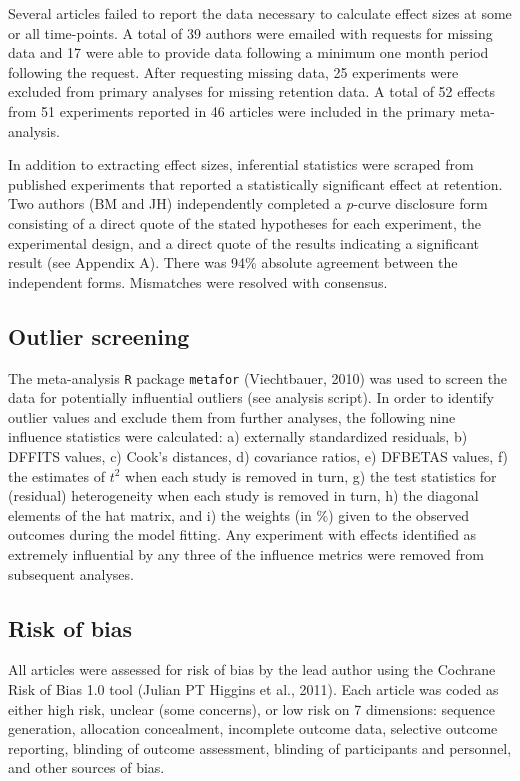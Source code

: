 \documentclass[
  english,
  man, donotrepeattitle,floatsintext]{apa7}
\begin{document}
Several articles failed to report the data necessary to calculate effect sizes at some or all time-points. A total of 39 authors were emailed with requests for missing data and 17 were able to provide data following a minimum one month period following the request. After requesting missing data, 25 experiments were excluded from primary analyses for missing retention data. A total of 52 effects from 51 experiments reported in 46 articles were included in the primary meta-analysis.

In addition to extracting effect sizes, inferential statistics were scraped from published experiments that reported a statistically significant effect at retention. Two authors (BM and JH) independently completed a \emph{p}-curve disclosure form consisting of a direct quote of the stated hypotheses for each experiment, the experimental design, and a direct quote of the results indicating a significant result (see Appendix A). There was 94\% absolute agreement between the independent forms. Mismatches were resolved with consensus.

\hypertarget{outlier-screening}{%
\subsection{Outlier screening}\label{outlier-screening}}

The meta-analysis \texttt{R} package \texttt{metafor} (Viechtbauer, 2010) was used to screen the data for potentially influential outliers (see analysis script). In order to identify outlier values and exclude them from further analyses, the following nine influence statistics were calculated: a) externally standardized residuals, b) DFFITS values, c) Cook's distances, d) covariance ratios, e) DFBETAS values, f) the estimates of \(t^2\) when each study is removed in turn, g) the test statistics for (residual) heterogeneity when each study is removed in turn, h) the diagonal elements of the hat matrix, and i) the weights (in \%) given to the observed outcomes during the model fitting. Any experiment with effects identified as extremely influential by any three of the influence metrics were removed from subsequent analyses.

\hypertarget{risk-of-bias}{%
\subsection{Risk of bias}\label{risk-of-bias}}

All articles were assessed for risk of bias by the lead author using the Cochrane Risk of Bias 1.0 tool (Julian PT Higgins et al., 2011). Each article was coded as either high risk, unclear (some concerns), or low risk on 7 dimensions: sequence generation, allocation concealment, incomplete outcome data, selective outcome reporting, blinding of outcome assessment, blinding of participants and personnel, and other sources of bias.
\end{document}
